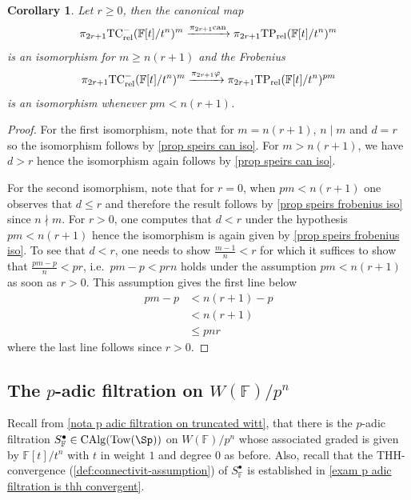 \documentclass[english,10pt]{amsart}
\newcommand{\rel}{\textup{rel}}
\newcommand{\field}{\mathbb{F}}
\newtheorem{coro}{Corollary}[section]
\theoremstyle{definition}
\numberwithin{equation}{section}
\newcommand{\rntc}{\mathrm{TC}_{\rel}^{-}}
\newcommand{\rtp}{\mathrm{TP}_{\rel}}
\newcommand{\Tow}{\mathrm{Tow}}
\begin{document}
\begin{coro}\label{coro phi and can for truncated witt}
Let $r \geq 0$, then the canonical map 
\[\pi_{2r+1} \rntc(\field[t]/t^n)^m \xrightarrow{\pi_{2r+1} \textup{can}} \pi_{2r+1} \rtp(\field[t]/t^n)^m\]
is an isomorphism for $m \geq n(r+1)$ and the Frobenius
\[\pi_{2r+1} \rntc(\field[t]/t^n)^m \xrightarrow{\pi_{2r+1} \varphi} \pi_{2r+1} \rtp(\field[t]/t^n)^{pm}\]
is an isomorphism whenever $pm <n(r+1)$.
\end{coro}
\begin{proof}
For the first isomorphism, note that for $m = n(r+1)$, $n \mid m$ and $d= r$ so the isomorphism follows by \autoref{prop speirs can iso}. For $m > n(r+1)$, we have $d>r$ hence the isomorphism again follows by \autoref{prop speirs can iso}. 

For the second isomorphism, note that for $r = 0$, when $pm <n(r+1)$ one observes that $d \leq r$ and  therefore the result follows by \autoref{prop speirs frobenius iso} since $n \nmid m$. 
For $r>0$, one computes that $d<r$ under the hypothesis $pm <n(r+1)$ hence the isomorphism is again given by \autoref{prop speirs frobenius iso}. To see that $d<r$, one needs to show $\frac{m-1}{n}<r$ for which it suffices to show that $\frac{pm-p}{n}<pr$, i.e.\ $pm-p<prn$  holds under the assumption $pm<n(r+1)$ as soon as $r>0$. This assumption gives the first line below
\begin{equation*}
\begin{split}
pm -p&< n(r+1)-p\\
& <n(r+1)\\
& \leq pnr
\end{split}
\end{equation*}
where the last line follows since $r>0$. 
\end{proof}


\subsection{The $p$-adic filtration on $W(\field)/p^n$}
Recall from \autoref{nota  p adic filtration on truncated witt}, that there is the $p$-adic filtration $S_{\field}^\bullet \in \mathrm{CAlg}(\Tow(\Sp))$   on $W(\field)/p^n$ whose associated graded is given by $\field[t]/t^n$ with $t$ in weight $1$ and degree $0$ as before. 
Also, recall that the THH-convergence (\autoref{def:connectivit-assumption}) of $S_{\field}^{\bullet}$ is established in \autoref{exam p adic filtration is thh convergent}.
\end{document}
